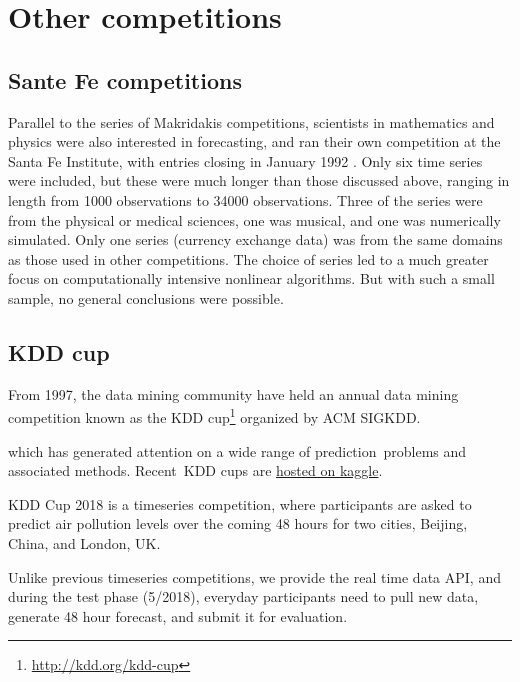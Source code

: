 \documentclass[11pt,a4paper,]{article}
\begin{document}
\hypertarget{other-competitions}{%
\section{Other competitions}\label{other-competitions}}

\hypertarget{sante-fe-competitions}{%
\subsection*{Sante Fe competitions}\label{sante-fe-competitions}}

Parallel to the series of Makridakis competitions, scientists in mathematics and physics were also interested in forecasting, and ran their own competition at the Santa Fe Institute, with entries closing in January 1992 \autocite{WG1993}. Only six time series were included, but these were much longer than those discussed above, ranging in length from 1000 observations to 34000 observations. Three of the series were from the physical or medical sciences, one was musical, and one was numerically simulated. Only one series (currency exchange data) was from the same domains as those used in other competitions. The choice of series led to a much greater focus on computationally intensive nonlinear algorithms. But with such a small sample, no general conclusions were possible.

\hypertarget{kdd-cup}{%
\subsection*{KDD cup}\label{kdd-cup}}

From 1997, the data mining community have held an annual data mining competition known as the KDD cup\footnote{\url{http://kdd.org/kdd-cup}} organized by ACM SIGKDD.

which has generated attention on a wide range of prediction~problems and associated methods. Recent~KDD cups are \href{https://www.kaggle.com/c/kdd-cup-2014-predicting-excitement-at-donors-choose}{hosted on kaggle}.

KDD Cup 2018 is a timeseries competition, where participants are asked to predict air pollution levels over the coming 48 hours for two cities, Beijing, China, and London, UK.

Unlike previous timeseries competitions, we provide the real time data API, and during the test phase (5/2018), everyday participants need to pull new data, generate 48 hour forecast, and submit it for evaluation.
\end{document}
